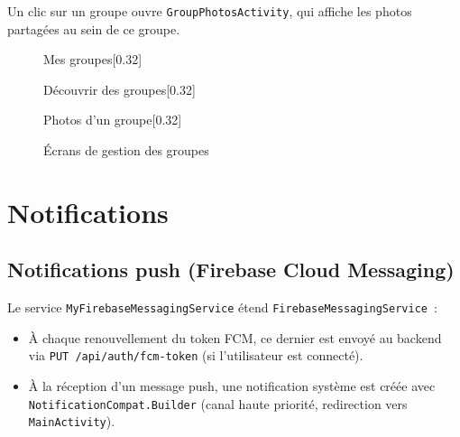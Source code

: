 \documentclass[12pt, a4paper]{report}
\begin{document}
Un clic sur un groupe ouvre \texttt{GroupPhotosActivity}, qui affiche les photos partagées
au sein de ce groupe.

\begin{figure}[H]
  \centering
  \begin{subcaptionbox}{Mes groupes\label{fig:groups_my}}[0.32\textwidth]
  \end{subcaptionbox}
  \hfill
  \begin{subcaptionbox}{Découvrir des groupes\label{fig:groups_discover}}[0.32\textwidth]
  \end{subcaptionbox}
  \hfill
  \begin{subcaptionbox}{Photos d'un groupe\label{fig:group_photos}}[0.32\textwidth]
  \end{subcaptionbox}
  \caption{Écrans de gestion des groupes}
  \label{fig:groups}
\end{figure}

\section{Notifications}

\subsection{Notifications push (Firebase Cloud Messaging)}

Le service \texttt{MyFirebaseMessagingService} étend \texttt{FirebaseMessagingService}~:
\begin{itemize}
  \item À chaque renouvellement du token FCM, ce dernier est envoyé au backend via
        \texttt{PUT /api/auth/fcm-token} (si l'utilisateur est connecté).
  \item À la réception d'un message push, une notification système est créée avec
        \texttt{NotificationCompat.Builder} (canal haute priorité, redirection vers
        \texttt{MainActivity}).
\end{itemize}
\end{document}
